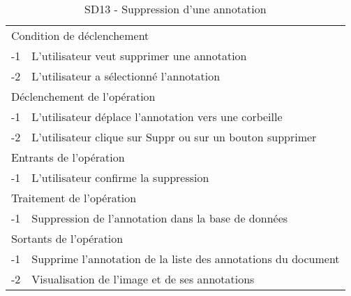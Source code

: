 \documentclass[a4paper]{article}
\begin{document}
\begin{table}[H]
  \centering
   \small
	\begin{tabular}{|c|p{12cm}|}
   		\hline
   			\rowcolor{lightgray}\multicolumn{2}{|c|}{\textbf{SD13 - Suppression d'une annotation}} \\
   		\hline
   			\multicolumn{2}{|l|}{Condition de d\'eclenchement} \\
   		\hline
   			-1 & L’utilisateur veut supprimer une annotation\\
			-2 & L’utilisateur a sélectionné l’annotation\\
   		\hline
   			\multicolumn{2}{|l|}{D\'eclenchement de l'op\'eration} \\
   		\hline
   			-1 & L’utilisateur déplace l’annotation vers une corbeille\\
			-2 & L’utilisateur clique sur Suppr ou sur un bouton supprimer\\
   		\hline
   			\multicolumn{2}{|l|}{Entrants de l'op\'eration} \\
   		\hline
   			-1 & L’utilisateur confirme la suppression\\
   		\hline
   			\multicolumn{2}{|l|}{Traitement de l'op\'eration} \\
  		\hline
   			-1 & Suppression de l’annotation dans la base de données\\
   		\hline
   			\multicolumn{2}{|l|}{Sortants de l'op\'eration} \\
   		\hline
   			-1 & Supprime l’annotation de la liste des annotations du document\\
			-2 & Visualisation de l’image et de ses annotations\\
   		\hline
	\end{tabular}
  \caption{SD13 - Suppression d'une annotation}
  \normalsize
  \label{tab:supprimer_annotation}
\end{table}
\end{document}
